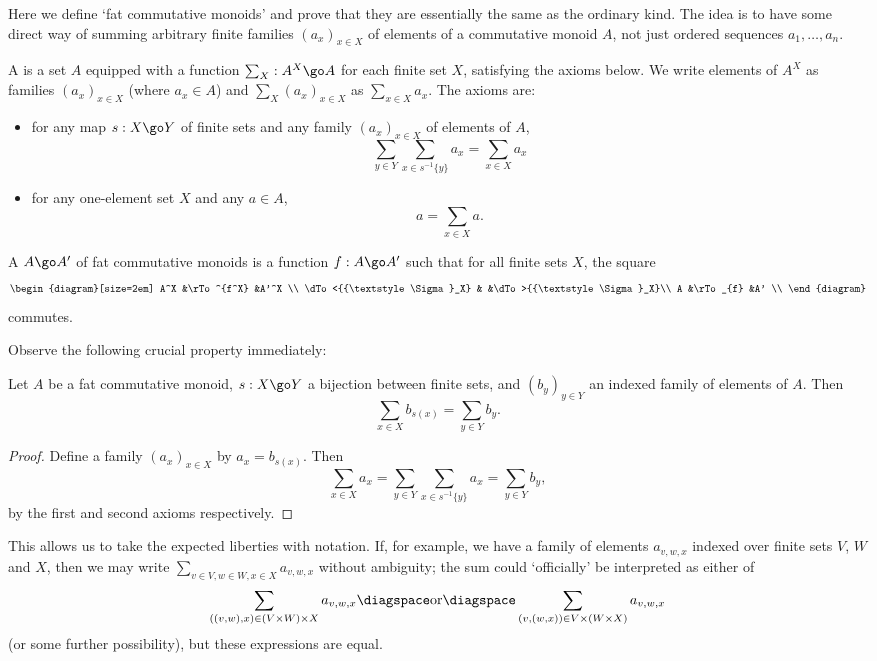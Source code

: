 Here we define `fat commutative monoids' and prove that they are
essentially the same as the ordinary kind.  The idea is to have some direct
way of summing arbitrary finite families $(a_x)_{x\in X}$ of elements of a
commutative monoid $A$, not just ordered sequences $a_1, \ldots, a_n$.
%
\begin{defn}	
A %
%
%
is a set $A$ equipped with a function
$\sum_X: A^X \go A$%
% 
% 
for each finite set $X$, satisfying the axioms below.
We write elements of $A^X$ as families $(a_x)_{x\in X}$ (where $a_x \in
A$) and $\sum_{X} (a_x)_{x\in X}$ as $\sum_{x\in X} a_x$.  The axioms are:
%
\begin{itemize}
\item for any map $s: X \go Y$ of finite sets and any family $(a_x)_{x\in
X}$ of elements of $A$, 
\[
\sum_{y\in Y} \sum_{x \in s^{-1} \{y\}} a_x
=
\sum_{x\in X} a_x
\]
\item for any one-element set $X$ and any $a\in A$, 
\[
a = \sum_{x\in X} a.
\]
\end{itemize}
%
A  $A \go A'$ of fat commutative monoids is a function $f: A \go
A'$ such that for all finite sets $X$, the square
\[
\begin{diagram}[size=2em]
A^X		&\rTo^{f^X}	&A'^X		\\
\dTo<{{\textstyle\Sigma}_X}	&		&\dTo>{{\textstyle\Sigma}_X}\\
A		&\rTo_{f}	&A'		\\
\end{diagram}
\]
commutes.  
\end{defn}
%
Observe the following crucial property immediately:
%
\begin{lemma}	
Let $A$ be a fat commutative monoid, $s: X \go Y$ a bijection between
finite sets, and $(b_y)_{y\in Y}$ an indexed family of elements of $A$.
Then 
\[
\sum_{x\in X} b_{s(x)} = \sum_{y\in Y} b_y.
\]
\end{lemma}
%
\begin{proof}
Define a family $(a_x)_{x\in X}$ by $a_x = b_{s(x)}$.  Then
\[
\sum_{x\in X} a_x 
=
\sum_{y\in Y} \sum_{x\in s^{-1}\{y\}} a_x 
=
\sum_{y\in Y} b_y,
\]
by the first and second axioms respectively.
\done
\end{proof}

This allows us to take the expected liberties with notation.  If, for
example, we have a family of elements $a_{v,w,x}$ indexed over finite sets
$V$, $W$ and $X$, then we may write $\sum_{v\in V, w\in W, x\in X}
a_{v,w,x}$ without ambiguity; the sum could `officially' be interpreted as
either of
\[
\sum_{((v,w),x) \in (V\times W)\times X} a_{v,w,x}
\diagspace
\textrm{or}
\diagspace
\sum_{(v,(w,x)) \in V\times (W\times X)} a_{v,w,x}
\]
(or some further possibility), but these expressions are equal.

